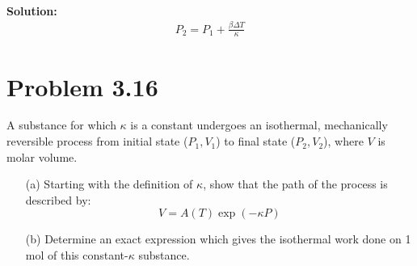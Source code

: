 \documentclass{article}
\newenvironment{solution}{\par\noindent\textbf{\\Solution:\\}}{\par\medskip}
\begin{document}
\begin{solution}
    \begin{gather*}
        P_{2}=P_{1}+\frac{\beta \Delta T}{\kappa }
    \end{gather*}
    \begin{center}
    \end{center}
\end{solution}

\section*{Problem 3.16}
A substance for which $\kappa$ is a constant undergoes an isothermal, mechanically reversible process from initial state ($P_1, V_1$) to final state ($P_2, V_2$), where $V$ is molar volume.
\begin{enumerate}
    \item[(a)] Starting with the definition of $\kappa$, show that the path of the process is described by:
    $$V = A(T)\exp(-\kappa P)$$
    \item[(b)] Determine an exact expression which gives the isothermal work done on 1 mol of this constant-$\kappa$ substance.
\end{enumerate}
\end{document}
